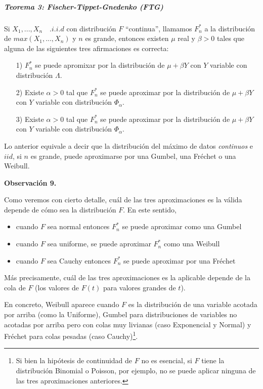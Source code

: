 \documentclass[
  oneside]{article}
\begin{document}
\hypertarget{teorema-3-fischer-tippet-gnedenko-ftg}{%
\subparagraph{Teorema 3: Fischer-Tippet-Gnedenko
(FTG)}\label{teorema-3-fischer-tippet-gnedenko-ftg}}

Si \(X_1,...,X_n\quad .i.i.d\) con distribución \(F\) ``continua'',
llamamos \(F_n^*\) a la distribución de \(max(X_1,...,X_n)\) y \(n\) es
grande, entonces existen \(\mu\) real y \(\beta>0\) tales que alguna de
las siguientes tres afirmaciones es correcta:

\begin{itemize}
  \item[1)] $F_n^*$ se puede apromixar por la distribución de $\mu+\beta Y$ con $Y$ variable con distribución $\Lambda$.
  \item[2)] Existe $\alpha>0$ tal que $F_n^*$ se puede aproximar por la distribución de $\mu+\beta Y$ con $Y$ variable con distribución $\Phi_{\alpha}$. 
  \item[3)] Existe $\alpha>0$ tal que $F_n^*$ se puede aproximar por la distribución de $\mu+\beta Y$ con $Y$ variable con distribución $\Phi_{\alpha}$.
\end{itemize}

Lo anterior equivale a decir que la distribución del máximo de datos
\textit{continuos} e \(iid\), si \(n\) es grande, puede aproximarse por
una Gumbel, una Fréchet o una Weibull.

\textbf{Observación 9.}

Como veremos con cierto detalle, cuál de las tres aproximaciones es la
válida depende de cómo sea la distribución \(F\). En este sentido,

\begin{itemize}
\item cuando $F$ sea normal entonces $F_n^*$ se puede aproximar como una Gumbel
\item cuando $F$ sea uniforme, se puede aproximar $F_n^*$ como una Weibull
\item cuando $F$ sea Cauchy entonces $F_n^*$ se puede aproximar por una Fréchet
\end{itemize}

Más precisamente, cuál de las tres aproximaciones es la aplicable
depende de la cola de \(F\) (los valores de \(F(t)\) para valores
grandes de \(t\)).

En concreto, Weibull aparece cuando \(F\) es la distribución de una
variable acotada por arriba (como la Uniforme), Gumbel para
distribuciones de variables no acotadas por arriba pero con colas muy
livianas (caso Exponencial y Normal) y Fréchet para colas pesadas (caso
Cauchy)\footnote{Si bien  la hipótesis de continuidad de $F$ no es esencial, si $F$ tiene
la distribución Binomial o Poisson, por ejemplo, no se puede aplicar ninguna de las tres aproximaciones anteriores.}.
\end{document}
